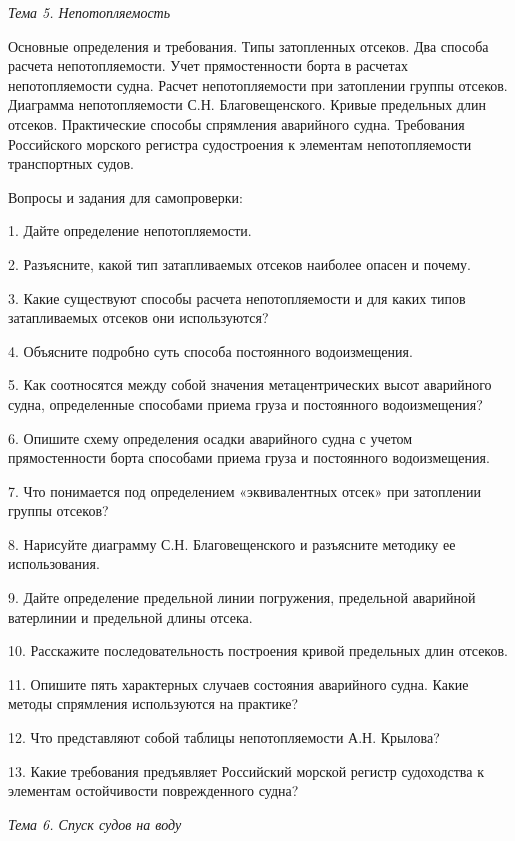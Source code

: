 \textit{Тема 5. Непотопляемость}

Основные определения и требования.
Типы затопленных отсеков.
Два способа расчета непотопляемости.
Учет прямостенности борта в расчетах непотопляемости судна.
Расчет непотопляемости при затоплении группы отсеков.
Диаграмма непотопляемости С.Н. Благовещенского.
Кривые предельных длин отсеков.
Практические способы спрямления аварийного судна.
Требования Российского морского регистра судостроения к элементам непотопляемости транспортных судов.

\vspace{0.5cm}

Вопросы и задания для самопроверки:

1.	Дайте определение непотопляемости.

2.	Разъясните, какой тип затапливаемых отсеков наиболее опасен и почему.

3.	Какие существуют способы расчета непотопляемости и для каких типов затапливаемых отсеков они используются?

4.	Объясните подробно суть способа постоянного водоизмещения.

5.	Как соотносятся между собой значения метацентрических высот аварийного судна, определенные способами приема груза и постоянного водоизмещения?

6.	Опишите схему определения осадки аварийного судна с учетом прямостенности борта способами приема груза и постоянного водоизмещения.

7.	Что понимается под определением «эквивалентных отсек» при затоплении группы отсеков?

8.	Нарисуйте диаграмму С.Н. Благовещенского и разъясните методику ее использования.

9.	Дайте определение предельной линии погружения, предельной аварийной ватерлинии и предельной длины отсека.

10.	Расскажите последовательность построения кривой предельных длин отсеков.

11.	Опишите пять характерных случаев состояния аварийного судна.
Какие методы спрямления используются на практике?

12.	Что представляют собой таблицы непотопляемости А.Н. Крылова?

13.	Какие требования предъявляет Российский морской регистр судоходства к элементам остойчивости поврежденного судна?

\vspace{0.5cm}

\textit{Тема 6. Спуск судов на воду}

